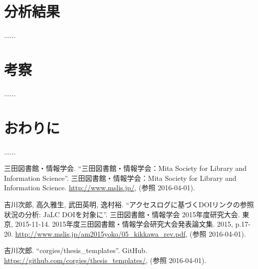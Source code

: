 \documentclass[a4paper,10pt,twocolumn]{jarticle} %
\begin{document}
\section{分析結果}
......

\section{考察}
......

\section{おわりに}
......

\begin{thebibliography}{99}
\small 三田図書館・情報学会. ``三田図書館・情報学会：Mita Society for Library and Information Science''. 三田図書館・情報学会：Mita Society for Library and Information Science. \url{http://www.mslis.jp/}, (参照 2016-04-01).

\small 吉川次郎, 高久雅生, 武田英明, 逸村裕. ``アクセスログに基づくDOIリンクの参照状況の分析: JaLC DOIを対象に''. 三田図書館・情報学会 2015年度研究大会. 東京, 2015-11-14. 2015年度三田図書館・情報学会研究大会発表論文集. 2015, p.17-20. \url{http://www.mslis.jp/am2015yoko/05_kikkawa_rev.pdf}, (参照 2016-04-01).

\small 吉川次郎. ``corgies/thesis\_templates''. GitHub. \url{https://github.com/corgies/thesis_templates/}, (参照 2016-04-01).

\end{thebibliography}
\end{document}

